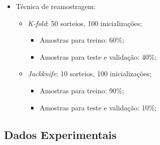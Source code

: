 \begin{itemize}
	\item Técnica de reamostragem:
	\begin{itemize}
		\item \textit{K-fold}: 50 sorteios, 100 inicializações;
		\begin{itemize}
			\item Amostras para treino: 60\%;
			\item Amostras para teste e validação: 40\%;
		\end{itemize}
		\item \textit{Jackknife}: 10 sorteios, 100 inicializações;
		\begin{itemize}
			\item Amostras para treino: 90\%;
			\item Amostras para teste e validação: 10\%;
		\end{itemize}
	\end{itemize}
\end{itemize}




\subsection{Dados Experimentais}

